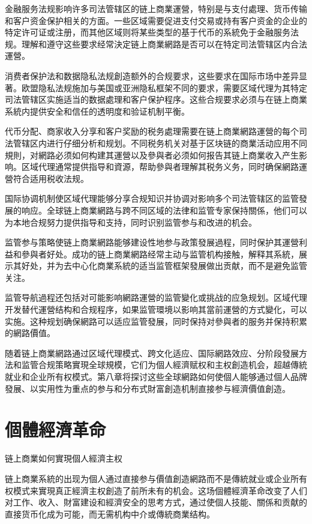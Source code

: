 \documentclass[
  Letterpaper,
]{scrbook}
\begin{document}
金融服务法规影响许多司法管辖区的链上商業運營，特别是与支付處理、货币传输和客户资金保护相关的方面。一些区域需要促进支付交易或持有客户资金的企业的特定许可证或注册，而其他区域则将某些类型的基于代币的系統免于金融服务法规。理解和遵守这些要求经常決定链上商業網路是否可以在特定司法管辖区内合法運營。

消费者保护法和数据隐私法规創造额外的合规要求，这些要求在国际市场中差异显著。欧盟隐私法规施加与美国或亚洲隐私框架不同的要求，需要区域代理为其特定司法管辖区实施适当的数据處理和客户保护程序。这些合规要求必须与在链上商業系統内提供安全和信任的透明度和验证机制平衡。

代币分配、商家收入分享和客户奖励的税务處理需要在链上商業網路運營的每个司法管辖区内进行仔细分析和规划。不同税务机关对基于区块链的商業活动应用不同規則，对網路必须如何构建其運營以及參與者必须如何报告其链上商業收入产生影响。区域代理通常提供指导和資源，帮助參與者理解其税务义务，同时确保網路運營符合适用税收法规。

国际协调机制使区域代理能够分享合规知识并协调对影响多个司法管辖区的监管發展的响应。全球链上商業網路与跨不同区域的法律和监管专家保持關係，他们可以为本地合规努力提供指导和支持，同时识别监管参与和改进的机会。

监管参与策略使链上商業網路能够建设性地参与政策發展過程，同时保护其運營利益和參與者好处。成功的链上商業網路经常主动与监管机构接触，解释其系統，展示其好处，并为去中心化商業系統的适当监管框架發展做出贡献，而不是避免监管关注。

监管导航過程还包括对可能影响網路運營的监管變化或挑战的应急规划。区域代理开发替代運營结构和合规程序，如果监管環境以影响其當前運營的方式變化，可以实施。这种规划确保網路可以适应监管發展，同时保持对參與者的服务并保持积累的網路價值。

随着链上商業網路通过区域代理模式、跨文化适应、国际網路效应、分阶段發展方法和监管合规策略實現全球規模，它们为個人經濟赋权和主权創造机会，超越傳統就业和企业所有权模式。第八章将探讨这些全球網路如何使個人能够通过個人品牌發展、以实用性为重点的参与和分布式財富創造机制直接参与經濟價值創造。

\chapter{個體經濟革命}\label{sec-individual-economy}

链上商業如何實現個人經濟主权

链上商業系統的出现为個人通过直接参与價值創造網路而不是傳統就业或企业所有权模式来實現真正經濟主权創造了前所未有的机会。这场個體經濟革命改变了人们对工作、收入、財富建设和經濟安全的思考方式，通过使個人技能、關係和贡献的直接货币化成为可能，而无需机构中介或傳統商業结构。
\end{document}
